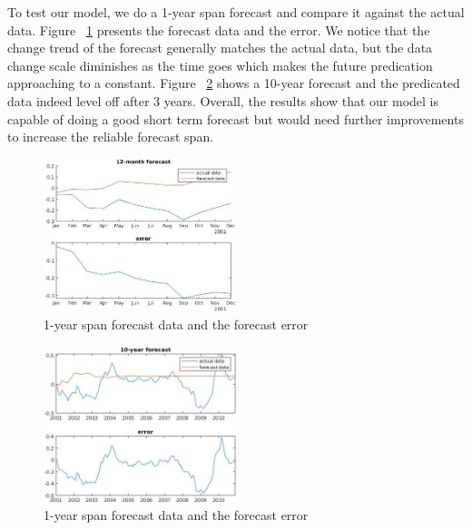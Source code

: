 \documentclass{article}
\begin{document}
To test our model, we do a 1-year span forecast and compare it against the actual data. Figure ~\ref{fig:forecast1} presents the forecast data and the error. We notice that the change trend of the forecast generally matches the actual data, but the data change scale diminishes as the time goes which makes the future predication approaching to a constant. Figure ~\ref{fig:forecast10} shows a 10-year forecast and the predicated data indeed level off after 3 years. Overall, the results show that our model is capable of doing a good short term forecast but would need further improvements to increase the reliable forecast span.

\begin{figure}[H]
    \centering
    \includegraphics[width=0.5\textwidth]{forecast-1-year.jpg}
    \caption{1-year span forecast data and the forecast error}
    \label{fig:forecast1}
\end{figure}

\begin{figure}[H]
    \centering
    \includegraphics[width=0.5\textwidth]{forecast-10-year.jpg}
    \caption{1-year span forecast data and the forecast error}
    \label{fig:forecast10}
\end{figure}

 

\end{document}
